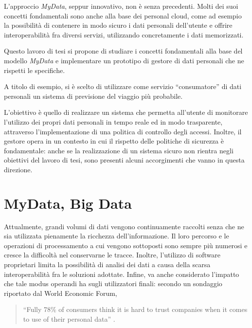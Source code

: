 L’approccio \textit{MyData}, seppur innovativo, non \`e senza precedenti. Molti dei suoi concetti fondamentali sono anche alla base dei personal cloud, come ad esempio la possibilit\`a di contenere in modo sicuro i dati personali dell’utente e offrire interoperabilit\`a fra diversi servizi, utilizzando concretamente i dati memorizzati.

Questo lavoro di tesi si propone di studiare i concetti fondamentali alla base del modello \textit{MyData} e implementare un prototipo di gestore di dati personali che ne rispetti le specifiche.

A titolo di esempio, si \`e scelto di utilizzare come servizio “consumatore” di dati personali un sistema di previsione del viaggio pi\`u probabile.

L’obiettivo \`e quello di realizzare un sistema che permetta all’utente di monitorare l’utilizzo dei propri dati personali in tempo reale ed in modo trasparente, attraverso l’implementazione di una politica di controllo degli accessi. Inoltre, il gestore opera in un contesto in cui il rispetto delle politiche di sicurezza \`e fondamentale: anche se la realizzazione di un sistema sicuro non rientra negli obiettivi del lavoro di tesi, sono presenti alcuni accorgimenti che vanno in questa direzione.

\section{MyData, Big Data}
Attualmente, grandi volumi di dati vengono continuamente raccolti senza che ne sia utilizzata pienamente la ricchezza dell’informazione. Il loro percorso e le operazioni di processamento a cui vengono sottoposti sono sempre pi\`u numerosi e cresce la difficolt\`a nel conservarne le tracce. Inoltre, l’utilizzo di software proprietari limita la possibilit\`a di analisi dei dati a causa della scarsa interoperabilit\`a fra le soluzioni adottate. Infine, va anche considerato l’impatto che tale modus operandi ha sugli utilizzatori finali: secondo un sondaggio riportato dal World Economic Forum, 
\begin{quote}
	“Fully 78\% of consumers think it is hard to trust companies when it comes to use of their personal data” \cite{orangeDigitalTrust}.
\end{quote}

